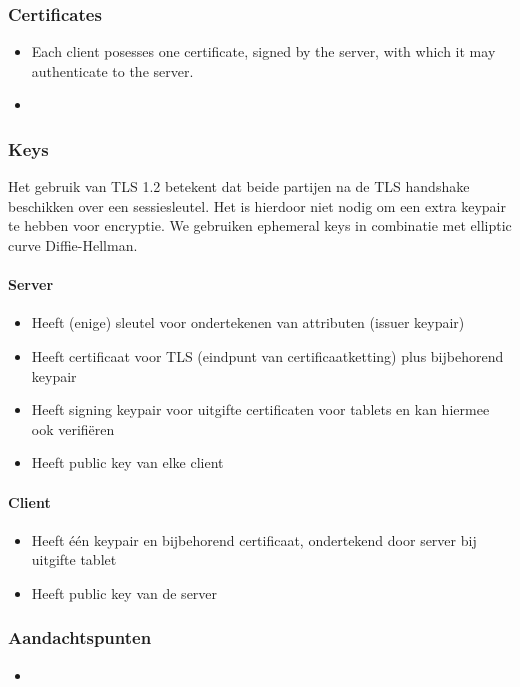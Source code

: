 \subsubsection{Certificates}
\begin{itemize}
	\item Each client posesses one certificate, signed by the server, with which it may authenticate to the server.
  \item 
\end{itemize}



\subsubsection{Keys}
Het gebruik van TLS 1.2 betekent dat beide partijen na de TLS handshake beschikken over een sessiesleutel. Het is hierdoor niet nodig om een extra keypair te hebben voor encryptie. We gebruiken ephemeral keys in combinatie met elliptic curve Diffie-Hellman. 

\paragraph{Server}
\begin{itemize}
	\item Heeft (enige) sleutel voor ondertekenen van attributen (issuer keypair)
  \item Heeft certificaat voor TLS (eindpunt van certificaatketting) plus bijbehorend keypair
  \item Heeft signing keypair voor uitgifte certificaten voor tablets en kan hiermee ook verifiëren
  \item Heeft public key van elke client
\end{itemize}

\paragraph{Client}
\begin{itemize}
	\item Heeft één keypair en bijbehorend certificaat, ondertekend door server bij uitgifte tablet
  \item Heeft public key van de server
\end{itemize}

\subsubsection{Aandachtspunten}
\begin{itemize}
  \item 
\end{itemize}


